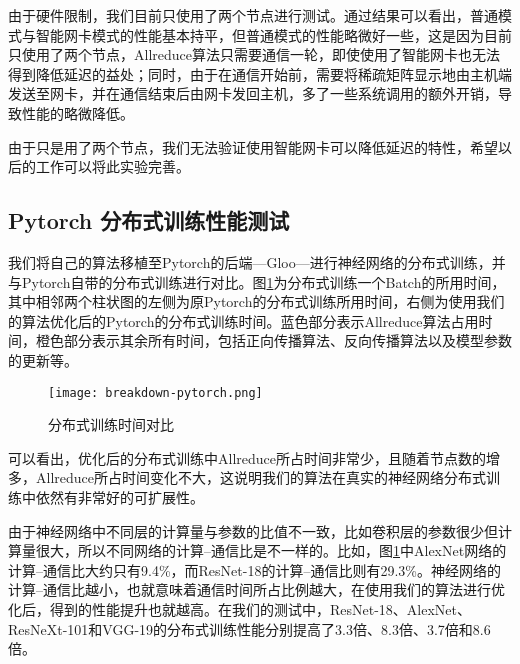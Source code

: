 由于硬件限制，我们目前只使用了两个节点进行测试。通过结果可以看出，普通模式与智能网卡模式的性能基本持平，但普通模式的性能略微好一些，这是因为目前只使用了两个节点，Allreduce算法只需要通信一轮，即使使用了智能网卡也无法得到降低延迟的益处；同时，由于在通信开始前，需要将稀疏矩阵显示地由主机端发送至网卡，并在通信结束后由网卡发回主机，多了一些系统调用的额外开销，导致性能的略微降低。

由于只是用了两个节点，我们无法验证使用智能网卡可以降低延迟的特性，希望以后的工作可以将此实验完善。

\subsection{Pytorch 分布式训练性能测试}
我们将自己的算法移植至Pytorch的后端---Gloo---进行神经网络的分布式训练，并与Pytorch自带的分布式训练进行对比。图\ref{fig:breakdown-pytorch}为分布式训练一个Batch的所用时间，其中相邻两个柱状图的左侧为原Pytorch的分布式训练所用时间，右侧为使用我们的算法优化后的Pytorch的分布式训练时间。蓝色部分表示Allreduce算法占用时间，橙色部分表示其余所有时间，包括正向传播算法、反向传播算法以及模型参数的更新等。

\begin{figure}[ht] %
    \centering
    \texttt{[image: breakdown-pytorch.png]}
    \caption{分布式训练时间对比}
    \label{fig:breakdown-pytorch}
  \end{figure}

可以看出，优化后的分布式训练中Allreduce所占时间非常少，且随着节点数的增多，Allreduce所占时间变化不大，这说明我们的算法在真实的神经网络分布式训练中依然有非常好的可扩展性。

由于神经网络中不同层的计算量与参数的比值不一致，比如卷积层的参数很少但计算量很大，所以不同网络的计算--通信比是不一样的。比如，图\ref{fig:breakdown-pytorch}中AlexNet网络的计算--通信比大约只有9.4\%，而ResNet-18的计算--通信比则有29.3\%。神经网络的计算--通信比越小，也就意味着通信时间所占比例越大，在使用我们的算法进行优化后，得到的性能提升也就越高。在我们的测试中，ResNet-18、AlexNet、ResNeXt-101和VGG-19的分布式训练性能分别提高了3.3倍、8.3倍、3.7倍和8.6倍。

